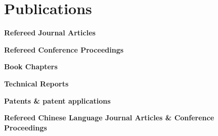 \documentclass[11pt]{article}
\newenvironment{main}
{\begin{adjustwidth}{3em}{}}
{\end{adjustwidth}}
\begin{document}
\section*{Publications}
\begin{main}

\textbf{Refereed Journal Articles}
\begin{refsection}
  \nocite{
    sun2021online,
    yu2019examination,
    feng2018estimation,
    feng2018drivers,
    feng2018effects,
    feng2017can,
    feng2017computer,
    cheng2012driver,
  }
\printbibliography[heading=none]  %
\end{refsection}

\textbf{Refereed Conference Proceedings}
\begin{refsection}
  \nocite{
    feng2021cyclingsim,
    feng2020naturalistic,
    bao2019examination,
    feng2018vehicle,
    jeong2017computational,
    feng2016spectral,
    chen2016development,
    feng2014computer,
    feng2013computational,
    feng2009board,
    zhang2008a,
    zhang2008b,
    lin2008analysis,
  }
\printbibliography[heading=none]  %
\end{refsection}

\textbf{Book Chapters}
\begin{refsection}
  \nocite{
    owens2019automated,
    pradhan2019training,
  }
\printbibliography[heading=none]  %
\end{refsection}

\textbf{Technical Reports}
\begin{refsection}
  \nocite{
    feng2013speech,
    chen2012survey,
  }
\printbibliography[heading=none]  %
\end{refsection}

\textbf{Patents \& patent applications}
\begin{refsection}
  \nocite{
    delp2020system,
    delp2020passing, 
    Sarvestani2019systems,
  }
\printbibliography[heading=none]  %
\end{refsection}


\textbf{Refereed Chinese Language Journal Articles \& Conference Proceedings}
\begin{refsection}
  \nocite{
    zhang2010real,
    cheng2009driver,
    cheng2008real,
    feng2008rear,
    cheng2007review,
  }
\printbibliography[heading=none]  %
\end{refsection}


\end{main}
\end{document}
